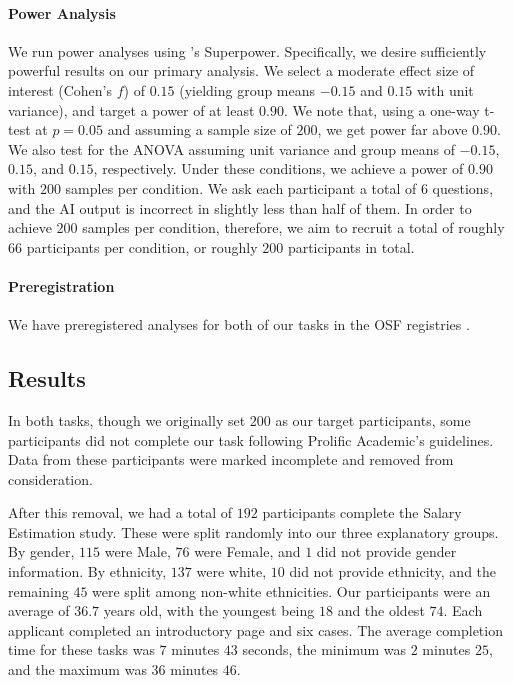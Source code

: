 \paragraph{Power Analysis}
We run power analyses using \textcite{caldwell_power_nodate}'s Superpower. Specifically, we desire sufficiently powerful results on our primary analysis. We select a moderate effect size of interest (Cohen’s $f$) of $0.15$ (yielding group means $-0.15$ and $0.15$ with unit variance), and target a power of at least $0.90$. We note that, using a one-way t-test at $p = 0.05$ and assuming a sample size of $200$, we get power far above $0.90$. We also test for the ANOVA assuming unit variance and group means of $-0.15$, $0.15$, and $0.15$, respectively. Under these conditions, we achieve a power of $0.90$ with $200$ samples per condition. We ask each participant a total of 6 questions, and the AI output is incorrect in slightly less than half of them. In order to achieve $200$ samples per condition, therefore, we aim to recruit a total of roughly $66$ participants per condition, or roughly $200$ participants in total.

\paragraph{Preregistration}
We have preregistered analyses for both of our tasks in the OSF registries \cite{natarajan_binns_2022}. 

\subsection{Results}\label{ssec:os_results}
In both tasks, though we originally set $200$ as our target participants, some participants did not complete our task following Prolific Academic's guidelines. Data from these participants were marked incomplete and removed from consideration. 

After this removal, we had a total of $192$ participants complete the Salary Estimation study. These were split randomly into our three explanatory groups. By gender, $115$ were Male, $76$ were Female, and $1$ did not provide gender information. By ethnicity, $137$ were white, $10$ did not provide ethnicity, and the remaining $45$ were split among non-white ethnicities. Our participants were an average of $36.7$ years old, with the youngest being $18$ and the oldest $74$. Each applicant completed an introductory page and six cases. The average completion time for these tasks was $7$ minutes $43$ seconds, the minimum was $2$ minutes $25$, and the maximum was $36$ minutes $46$.

